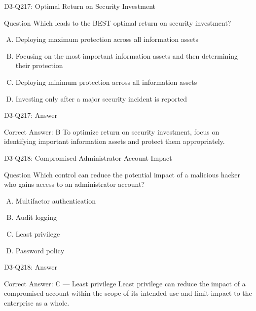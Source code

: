 \documentclass{beamer}
\begin{document}
	\begin{frame}{D3-Q217: Optimal Return on Security Investment}
		\begin{block}{Question}
			Which leads to the BEST optimal return on security investment?
		\end{block}
		\begin{enumerate}[(A)]
			\item Deploying maximum protection across all information assets
			\item Focusing on the most important information assets and then determining their protection
			\item Deploying minimum protection across all information assets
			\item Investing only after a major security incident is reported
		\end{enumerate}
	\end{frame}
	\begin{frame}{D3-Q217: Answer}
		\begin{block}{Correct Answer: B}
			To optimize return on security investment, focus on identifying important information assets and protect them appropriately.
		\end{block}
	\end{frame}
	
	\begin{frame}{D3-Q218: Compromised Administrator Account Impact}
		\begin{block}{Question}
			Which control can reduce the potential impact of a malicious hacker who gains access to an administrator account?
		\end{block}
		\begin{enumerate}[(A)]
			\item Multifactor authentication
			\item Audit logging
			\item Least privilege
			\item Password policy
		\end{enumerate}
	\end{frame}
	\begin{frame}{D3-Q218: Answer}
		\begin{block}{Correct Answer: C --- Least privilege}
			Least privilege can reduce the impact of a compromised account within the scope of its intended use and limit impact to the enterprise as a whole.
		\end{block}
	\end{frame}
	
\end{document}
